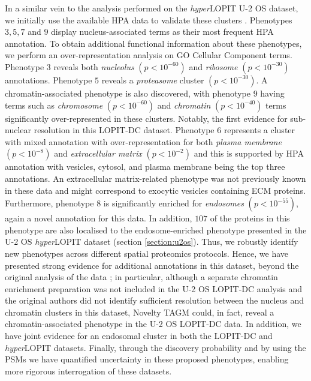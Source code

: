 \documentclass[12pt,english]{article}
\begin{document}
 In a similar vein to the analysis performed on the \textit{hyper}LOPIT U-2 OS dataset, we initially use the available HPA data to validate these clusters \citep{Thul:2017}. Phenotypes $3,5,7$ and $9$ display nucleus-associated terms as their most frequent HPA annotation. To obtain additional functional information about these phenotypes, we perform an over-representation analysis on GO Cellular Component terms. Phenotype $3$ reveals both \textit{nucleolus} $(p < 10^{-60})$ and \textit{ribosome} $(p < 10^{-30})$ annotations. Phenotype $5$ reveals a \textit{proteasome} cluster $(p < 10^{-30})$. A chromatin-associated phenotype is also discovered, with phenotype $9$ having terms such as \textit{chromosome} $(p < 10^{-60})$ and \textit{chromatin} $(p < 10^{-40})$ terms significantly over-represented in these clusters. Notably, the first evidence for sub-nuclear resolution in this LOPIT-DC dataset. Phenotype $6$ represents a cluster with mixed annotation with over-representation for both \textit{plasma membrane} $(p < 10^{-8})$ and \textit{extracellular matrix} $(p < 10^{-2})$ and this is supported by HPA annotation with vesicles, cytosol, and plasma membrane being the top three annotations. An extracellular matrix-related phenotype was not previously known in these data and might correspond to exocytic vesicles containing ECM proteins. Furthermore, phenotype $8$ is significantly enriched for \textit{endosomes} $(p < 10^{-55})$, again a novel annotation for this data. In addition, $107$ of the proteins in this phenotype are also localised to the endosome-enriched phenotype presented in the U-2 OS \textit{hyper}LOPIT dataset (section \ref{section:u2os}). Thus, we robustly identify new phenotypes across different spatial proteomics protocols. Hence, we have presented strong evidence for additional annotations in this dataset, beyond the original analysis of the data \citep{DC:2018}; in particular, although a separate chromatin enrichment preparation was not included in the U-2 OS LOPIT-DC analysis and the original authors did not identify sufficient resolution between the nucleus and chromatin clusters in this dataset, Novelty TAGM could, in fact, reveal a chromatin-associated phenotype in the U-2 OS LOPIT-DC data. In addition, we have joint evidence for an endosomal cluster in both the LOPIT-DC and \textit{hyper}LOPIT datasets. Finally, through the discovery probability and by using the PSMs we have quantified uncertainty in these proposed phenotypes, enabling more rigorous interrogation of these datasets.
 
\end{document}
